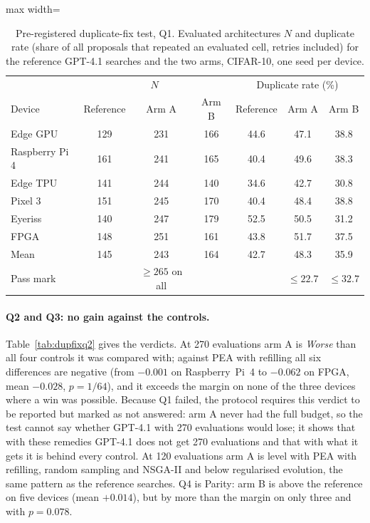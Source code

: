 \documentclass[preprint,12pt,authoryear]{elsarticle}
\begin{document}
\begin{table}[h]\centering\footnotesize
\caption{Pre-registered duplicate-fix test, Q1. Evaluated architectures $N$ and duplicate rate (share of all proposals that repeated an evaluated cell, retries included) for the reference GPT-4.1 searches and the two arms, CIFAR-10, one seed per device.}\label{tab:dupfixq1}
\setlength{\tabcolsep}{4pt}
\begin{adjustbox}{max width=\linewidth}
\begin{tabular}{l|ccc|ccc}
\toprule
 & \multicolumn{3}{c|}{$N$} & \multicolumn{3}{c}{Duplicate rate (\%)} \\
Device & Reference & Arm A & Arm B & Reference & Arm A & Arm B \\
\midrule
Edge GPU       & 129 & 231 & 166 & 44.6 & 47.1 & 38.8 \\
Raspberry Pi 4 & 161 & 241 & 165 & 40.4 & 49.6 & 38.3 \\
Edge TPU       & 141 & 244 & 140 & 34.6 & 42.7 & 30.8 \\
Pixel 3        & 151 & 245 & 170 & 40.4 & 48.4 & 38.8 \\
Eyeriss        & 140 & 247 & 179 & 52.5 & 50.5 & 31.2 \\
FPGA           & 148 & 251 & 161 & 43.8 & 51.7 & 37.5 \\
\midrule
Mean           & 145 & 243 & 164 & 42.7 & 48.3 & 35.9 \\
Pass mark      &     & $\ge265$ on all & & & $\le22.7$ & $\le32.7$ \\
\bottomrule
\end{tabular}
\end{adjustbox}
\end{table}

\paragraph{Q2 and Q3: no gain against the controls.} Table~\ref{tab:dupfixq2} gives the verdicts. At 270 evaluations arm A is \emph{Worse} than all four controls it was compared with; against PEA with refilling all six differences are negative (from $-0.001$ on Raspberry~Pi~4 to $-0.062$ on FPGA, mean $-0.028$, $p=1/64$), and it exceeds the margin on none of the three devices where a win was possible. Because Q1 failed, the protocol requires this verdict to be reported but marked as not answered: arm A never had the full budget, so the test cannot say whether GPT-4.1 with 270 evaluations would lose; it shows that with these remedies GPT-4.1 does not get 270 evaluations and that with what it gets it is behind every control. At 120 evaluations arm A is level with PEA with refilling, random sampling and NSGA-II and below regularised evolution, the same pattern as the reference searches. Q4 is Parity: arm B is above the reference on five devices (mean $+0.014$), but by more than the margin on only three and with $p=0.078$.
\end{document}
